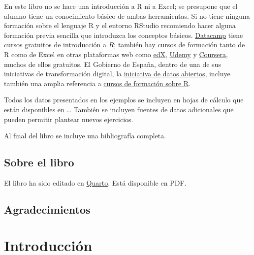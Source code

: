 \documentclass[
  letterpaper,
]{scrbook}
\begin{document}
En este libro no se hace una introducción a R ni a Excel; se presupone
que el alumno tiene un conocimiento básico de ambas herramientas. Si no
tiene ninguna formación sobre el lenguaje R y el entorno RStudio
recomiendo hacer alguna formación previa sencilla que introduzca los
conceptos básicos. \href{https://www.datacamp.com/}{Datacamp} tiene
\href{https://www.datacamp.com/courses/free-introduction-to-r}{cursos
gratuitos de introducción a \(R\)}; también hay cursos de formación
tanto de R como de Excel en otras plataformas web como
\href{https://www.edx.org/}{edX},
\href{https://www.udemy.com/course/curso-de-introduccion-a-r/}{Udemy} y
\href{https://es.coursera.org/courses?query=r}{Coursera}, muchos de
ellos gratuitos. El Gobierno de España, dentro de una de sus iniciativas
de transformación digital, la \href{https://datos.gob.es/es}{iniciativa
de datos abiertos}, incluye también una amplia referencia a
\href{https://datos.gob.es/es/noticia/cursos-para-aprender-mas-sobre-r}{cursos
de formación sobre R}.

Todos los datos presentados en los ejemplos se incluyen en hojas de
cálculo que están disponibles en \ldots{} También se incluyen fuentes de
datos adicionales que pueden permitir plantear nuevos ejercicios.

Al final del libro se incluye una bibliografía completa.

\hypertarget{sobre-el-libro}{%
\section*{Sobre el libro}\label{sobre-el-libro}}

El libro ha sido editado en \href{https://quarto.org/}{Quarto}. Está
disponible en PDF.

\hypertarget{agradecimientos}{%
\section*{Agradecimientos}\label{agradecimientos}}


\hypertarget{introducciuxf3n}{%
\chapter{Introducción}\label{introducciuxf3n}}
\end{document}
